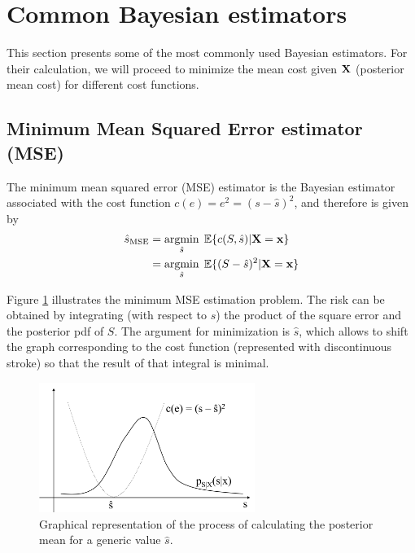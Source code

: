 \newpage

\section{Common Bayesian estimators}

This section presents some of the most commonly used Bayesian estimators. For their calculation, we will proceed to minimize the mean cost given $\bf X$ (posterior mean cost) for different cost functions.


\subsection{Minimum Mean Squared Error estimator (MSE)}

The minimum mean squared error (MSE) estimator is the Bayesian estimator associated with the cost function $c(e) = e^2 = (s-\hat s)^2$, and therefore is given by 
\begin{align}
\label{ec:coste_medio_cuadratico}
\hat{s}_\text{MSE} 
  & = \operatorname*{argmin}_{\hat s} \; \mathbb{E}\{c(S,\hat s)|{\bf X} = {\bf x} \}   \nonumber\\
  & = \operatorname*{argmin}_{\hat s} \; \mathbb{E}\{(S-\hat s)^2|{\bf X} = {\bf x} \}
\end{align}

Figure \ref{fig:estimador_cuadratico} illustrates the minimum MSE estimation problem. The risk can be obtained by integrating (with respect to $s$) the product of the square error and the posterior pdf of $S$. The argument for minimization is $\hat s$, which allows to shift the graph corresponding to the cost function (represented with discontinuous stroke) so that the result of that integral is minimal.

\begin{figure}[th]
  \begin{center}
    \includegraphics[width=7cm]{Figures//estimador_cuadratico.png}
    \caption{Graphical representation of the process of calculating the posterior mean for a generic value $\hat{s}$.}
    \label{fig:estimador_cuadratico}
  \end{center}
\end{figure}

